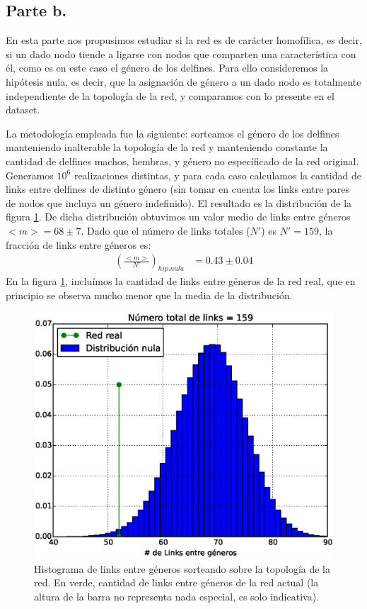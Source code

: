 \subsection{Parte b.}

\par En esta parte nos propusimos estudiar si la red es de carácter homofílica, es decir, si un dado nodo tiende a ligarse con nodos que comparten una característica con él, como es en este caso el género de los delfines. Para ello consideremos la hipótesis nula, es decir, que la asignación de género a un dado nodo es totalmente independiente de la topología de la red, y comparamos con lo presente en el dataset.
\par La metodología empleada fue la siguiente: sorteamos el género de los delfines manteniendo inalterable la topología de la red y manteniendo constante la cantidad de delfines machos, hembras, y género no específicado de la red original. Generamos $10^{6}$ realizaciones distintas, y para cada caso calculamos la cantidad de links entre delfines de distinto género (sin tomar en cuenta los links entre pares de nodos que incluya un género indefinido). El resultado es la distribución de la figura \ref{fig:Histograma}.
De dicha distribución obtuvimos un valor medio de links entre géneros $<m> = 68 \pm 7$. Dado que el número de links totales ($N'$) es $N' = 159$, la fracción de links entre géneros es:
\begin{align*}
	(\frac{<m>}{N'})_{hip.nula} & = 0.43 \pm 0.04
\end{align*}
En la figura \ref{fig:Histograma}, incluímos la cantidad de links entre géneros de la red real, que en principio se observa mucho menor que la media de la distribución.

\begin{figure}
\centering
\includegraphics[scale = 0.70]{figuras/Histograma.eps}
\caption{Histograma de links entre géneros sorteando sobre la topología de la red. En verde, cantidad de links entre géneros de la red actual (la altura de la barra no representa nada especial, es solo indicativa).}
\label{fig:Histograma}
\end{figure}

